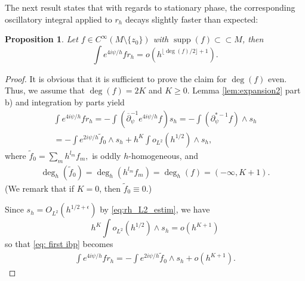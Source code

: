 \documentclass[12pt]{amsart}
\def\p{\partial}
\DeclareMathOperator{\supp}{supp}
\newtheorem{proposition}[theorem]{Proposition}
\theoremstyle{definition}
\theoremstyle{remark}
\newcommand{\eps}{\epsilon}
\newcommand{\op}{\overline \p}
\begin{document}
The next result states that with regards to stationary phase, the corresponding oscillatory integral applied to $r_h$ decays slightly faster than expected:
\begin{proposition}\label{prop:correct_decay_single_rh}
 Let %
 $f\in C^\infty(M\setminus \{z_0\})$ with $\supp(f)\subset\subset M$, then 
 \[
  \int e^{4i\psi/h}f r_h=o(h^{\lfloor \deg(f)/2\rfloor +1}).
 \]
\end{proposition}
\begin{proof}
It is obvious that it is sufficient to prove the claim for $\deg(f)$ even. 
Thus, we assume that $\deg(f)=2K$ and $K\geq 0$. Lemma \ref{lem:expansion2} part b) and integration by parts yield
 \begin{eqnarray}
\label{eq: first ibp}
 \int e^{4i\psi/h}f r_h=-\int (\op_\psi^{-1}e^{4i\psi/h}f) s_h=-\int (\p_\psi^{*-1}f)\wedge s_h \\\nonumber
 =-\int e^{2i\psi/h}\tilde f_0\wedge s_h + h^K\int o_{L^2}(h^{1/2})\wedge s_h,
\end{eqnarray}
where $\tilde f_0 =\sum_m h^{l_m}f_m,$ is oddly $h$-homogeneous,
and 
\begin{eqnarray}\label{degh of tilde f0}
\deg_h(\tilde f_0)=\deg_h(h^{l_m}f_m)=\deg_h(f)=(-\infty,K+1).
\end{eqnarray} (We remark that if $K=0$, then $\tilde f_0\equiv 0$.)

Since $s_h=O_{L^2}(h^{1/2+\eps})$ by \eqref{eq:rh_L2_estim}, we have 
\[
 h^K\int o_{L^2}(h^{1/2})\wedge s_h= o(h^{K+1})
\]
so that \eqref{eq: first ibp} becomes
\begin{eqnarray}
\label{eq: first ibp'}
\int e^{4i\psi/h}f r_h =-\int e^{2i\psi/h}\tilde f_0 \wedge s_h  + o(h^{K+1}).
\end{eqnarray}


\end{proof}
\end{document}
